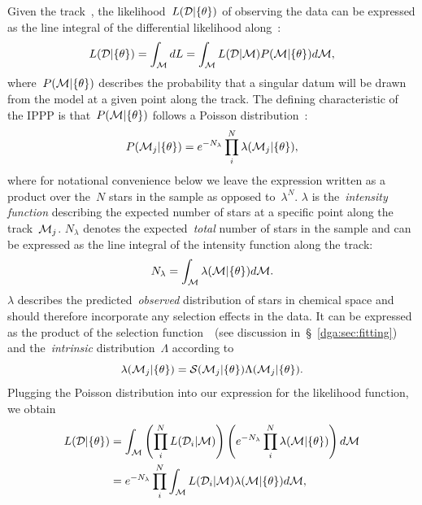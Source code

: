 \par
Given the track~, the likelihood~$L(\mathcal{D} | \{\theta\})$ of
observing the data can be expressed as the line integral of the differential
likelihood along~:
\begin{equation}
L(\mathcal{D} | \{\theta\}) = \int_{\mathcal{M}} dL =
\int_{\mathcal{M}} L(\mathcal{D} | \mathcal{M}) P(\mathcal{M} | \{\theta\})
d\mathcal{M},
\end{equation}
where~$P(\mathcal{M} | \{\theta\})$ describes the probability that a singular
datum will be drawn from the model at a given point along the track.
The defining characteristic of the IPPP is that~$P(\mathcal{M} | \{\theta\})$
follows a Poisson distribution~\citep{Press2007}:
\begin{equation}
P(\mathcal{M}_j | \{\theta\}) = e^{-N_\lambda}
\prod_i^N \lambda (\mathcal{M}_j | \{\theta\}),
\end{equation}
where for notational convenience below we leave the expression written as a
product over the~$N$ stars in the sample as opposed to~$\lambda^N$.
$\lambda$ is the~\textit{intensity function} describing the expected
number of stars at a specific point along the track~$\mathcal{M}_j$.
$N_\lambda$ denotes the expected~\textit{total} number of stars in the sample
and can be expressed as the line integral of the intensity function along the
track:
\begin{equation}
N_\lambda = \int_{\mathcal{M}} \lambda(\mathcal{M} | \{\theta\}) d\mathcal{M}.
\end{equation}
$\lambda$ describes the predicted~\textit{observed} distribution of stars in
chemical space and should therefore incorporate any selection effects in the
data.
It can be expressed as the product of the selection function~~(see
discussion in~\S~\ref{dga:sec:fitting}) and the~\textit{intrinsic}
distribution~$\Lambda$ according to
\begin{equation}
\lambda(\mathcal{M}_j | \{\theta\}) = \mathcal{S}(\mathcal{M}_j | \{\theta\})
\Lambda(\mathcal{M}_j | \{\theta\}).
\end{equation}
Plugging the Poisson distribution into our expression for the likelihood
function, we obtain
\begin{subequations}\begin{align}
L(\mathcal{D} | \{\theta\}) &= \int_{\mathcal{M}}
\left(\prod_i^N L(\mathcal{D}_i | \mathcal{M})\right)
\left(e^{-N_\lambda} \prod_i^N \lambda(\mathcal{M} | \{\theta\})\right)
d\mathcal{M}
\\
&= e^{-N_\lambda} \prod_i^N \int_{\mathcal{M}} L(\mathcal{D}_i | \mathcal{M})
\lambda(\mathcal{M} | \{\theta\}) d\mathcal{M},
\end{align}\end{subequations}
